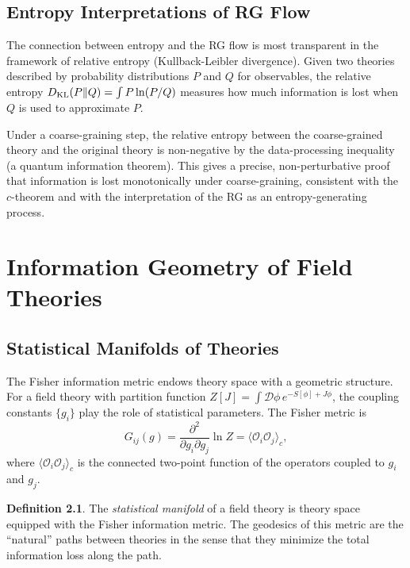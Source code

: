 \documentclass[12pt,a4paper,oneside]{book}
\theoremstyle{definition}
\newtheorem{definition}{Definition}[chapter]
\theoremstyle{plain}
\theoremstyle{remark}
\begin{document}
\section{Entropy Interpretations of RG Flow}

The connection between entropy and the RG flow is most transparent in the
framework of relative entropy (Kullback-Leibler divergence). Given two theories
described by probability distributions $P$ and $Q$ for observables, the
relative entropy $D_{\rm KL}(P\|Q) = \int P\ln(P/Q)$ measures how much
information is lost when $Q$ is used to approximate $P$.

Under a coarse-graining step, the relative entropy between the coarse-grained
theory and the original theory is non-negative by the data-processing inequality
(a quantum information theorem). This gives a precise, non-perturbative
proof that information is lost monotonically under coarse-graining, consistent
with the $c$-theorem and with the interpretation of the RG as an
entropy-generating process.

\chapter{Information Geometry of Field Theories}

\section{Statistical Manifolds of Theories}

The Fisher information metric endows theory space with a geometric structure.
For a field theory with partition function $Z[J] = \int\mathcal{D}\phi\,
e^{-S[\phi] + J\phi}$, the coupling constants $\{g_i\}$ play the role of
statistical parameters. The Fisher metric is
\begin{equation}
G_{ij}(g) = \frac{\partial^2}{\partial g_i\partial g_j}\ln Z = \langle\mathcal{O}_i\mathcal{O}_j\rangle_c,
\end{equation}
where $\langle\mathcal{O}_i\mathcal{O}_j\rangle_c$ is the connected two-point
function of the operators coupled to $g_i$ and $g_j$.

\begin{definition}
The \emph{statistical manifold} of a field theory is theory space equipped
with the Fisher information metric. The geodesics of this metric are the
``natural'' paths between theories in the sense that they minimize the
total information loss along the path.
\end{definition}
\end{document}
